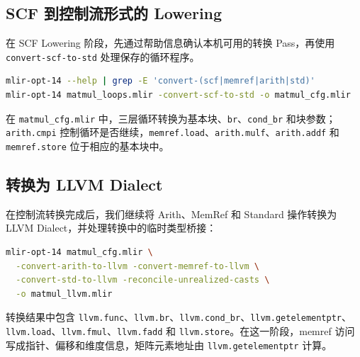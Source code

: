 \subsection{SCF 到控制流形式的 Lowering}

在 SCF Lowering 阶段，先通过帮助信息确认本机可用的转换 Pass，再使用 \texttt{convert-scf-to-std} 处理保存的循环程序。

\begin{lstlisting}[language=bash]
mlir-opt-14 --help | grep -E 'convert-(scf|memref|arith|std)'
mlir-opt-14 matmul_loops.mlir -convert-scf-to-std -o matmul_cfg.mlir
\end{lstlisting}


在 \texttt{matmul\_cfg.mlir} 中，三层循环转换为基本块、\texttt{br}、\texttt{cond\_br} 和块参数；\texttt{arith.cmpi} 控制循环是否继续，\texttt{memref.load}、\texttt{arith.mulf}、\texttt{arith.addf} 和 \texttt{memref.store} 位于相应的基本块中。


\subsection{转换为 LLVM Dialect}

在控制流转换完成后，我们继续将 Arith、MemRef 和 Standard 操作转换为 LLVM Dialect，并处理转换中的临时类型桥接：

\begin{lstlisting}[language=bash]
mlir-opt-14 matmul_cfg.mlir \
  -convert-arith-to-llvm -convert-memref-to-llvm \
  -convert-std-to-llvm -reconcile-unrealized-casts \
  -o matmul_llvm.mlir
\end{lstlisting}

转换结果中包含 \texttt{llvm.func}、\texttt{llvm.br}、\texttt{llvm.cond\_br}、\texttt{llvm.getelementptr}、\texttt{llvm.load}、\texttt{llvm.fmul}、\texttt{llvm.fadd} 和 \texttt{llvm.store}。在这一阶段，memref 访问写成指针、偏移和维度信息，矩阵元素地址由 \texttt{llvm.getelementptr} 计算。



